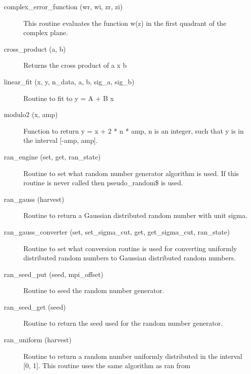 \begin{description}

\label{r:complex.error.function}
\item[complex_error_function (wr, wi, zr, zi)] \Newline 
This routine evaluates the function w(z) in the first quadrant of
the complex plane. 

\label{r:cross.product}
\item[cross_product (a, b)] \Newline 
Returns the cross product of a x b

\label{r:linear.fit}
\item[linear_fit (x, y, n_data, a, b, sig_a, sig_b)] \Newline 
Routine to fit to y = A + B x

\label{r:modulo2}
\item[modulo2 (x, amp)] \Newline 
Function to return y = x + 2 * n * amp, n is an integer, such that y is 
in the interval [-amp, amp].

\label{r:ran.engine}
\item[ran_engine (set, get, ran_state)] \Newline 
Routine to set what random number generator algorithm is used.
If this routine is never called then pseudo_random\$ is used.

\label{r:ran.gauss}
\item[ran_gauss (harvest)] \Newline 
Routine to return a Gaussian distributed random number with unit sigma.

\label{r:ran.gauss.converter}
\item[ran_gauss_converter (set, set_sigma_cut, get, get_sigma_cut, ran_state)] \Newline 
Routine to set what conversion routine is used for converting
uniformly distributed random numbers to Gaussian distributed random numbers.

\label{r:ran.seed.put}
\item[ran_seed_put (seed, mpi_offset)] \Newline 
Routine to seed the random number generator. 

\label{r:ran.seed.get}
\item[ran_seed_get (seed)] \Newline 
Routine to return the seed used for the random number generator.

\label{r:ran.uniform}
\item[ran_uniform (harvest)] \Newline 
Routine to return a random number uniformly distributed in the 
interval [0, 1]. This routine uses the same algorithm as ran from


\end{description}
